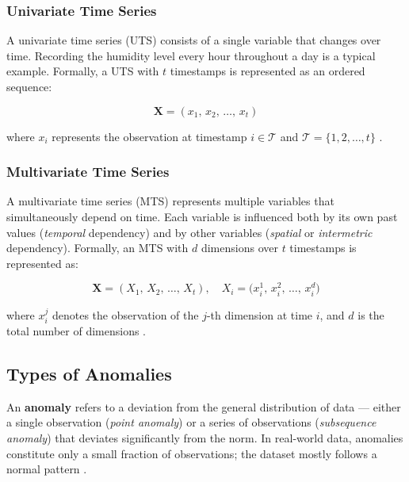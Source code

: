 \documentclass[twoside,11pt,openright]{report}
\begin{document}
\subsubsection{Univariate Time Series}
 
A univariate time series (UTS) consists of a single variable that changes over time.
Recording the humidity level every hour throughout a day is a typical example.
Formally, a UTS with $t$ timestamps is represented as an ordered sequence:
 
\begin{equation}
    \mathbf{X} = (x_1,\, x_2,\, \ldots,\, x_t)
    \label{eq:uts}
\end{equation}
 
\noindent where $x_i$ represents the observation at timestamp $i \in \mathcal{T}$ and $\mathcal{T} = \{1, 2, \ldots, t\}$ \citep{darban2024survey}.
 
\subsubsection{Multivariate Time Series}
 
A multivariate time series (MTS) represents multiple variables that simultaneously depend on time.
Each variable is influenced both by its own past values (\textit{temporal} dependency) and by other variables (\textit{spatial} or \textit{intermetric} dependency).
Formally, an MTS with $d$ dimensions over $t$ timestamps is represented as:
 
\begin{equation}
    \mathbf{X} = (X_1,\, X_2,\, \ldots,\, X_t), \quad
    X_i = \bigl(x_i^1,\, x_i^2,\, \ldots,\, x_i^d\bigr)
    \label{eq:mts}
\end{equation}
 
\noindent where $x_i^j$ denotes the observation of the $j$-th dimension at time $i$, and $d$ is the total number of dimensions \citep{darban2024survey}.


\subsection{Types of Anomalies}

An \textbf{anomaly} refers to a deviation from the general distribution of data --- either a single observation (\textit{point anomaly}) or a series of observations (\textit{subsequence anomaly}) that deviates significantly from the norm.
In real-world data, anomalies constitute only a small fraction of observations; the dataset mostly follows a normal pattern \citep{darban2024survey}.
 
\end{document}
